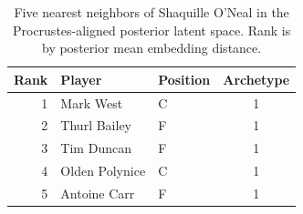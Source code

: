 \begin{table}[htbp]
  \centering\small
  \begin{tabular}{rllc}
    \toprule
    Rank & Player & Position & Archetype \\
    \midrule
    1 & Mark West & C & 1 \\
    2 & Thurl Bailey & F & 1 \\
    3 & Tim Duncan & F & 1 \\
    4 & Olden Polynice & C & 1 \\
    5 & Antoine Carr & F & 1 \\
    \bottomrule
  \end{tabular}
  \caption{Five nearest neighbors of Shaquille O'Neal in the Procrustes-aligned posterior latent space. Rank is by posterior mean embedding distance.}
  \label{tab:Shaquille_O_Neal_neighbors}
\end{table}

